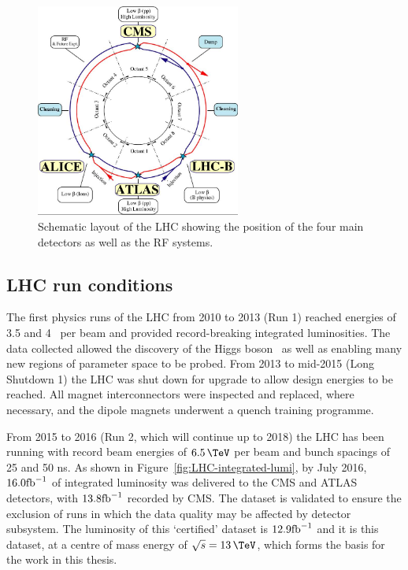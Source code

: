 \begin{figure}
\centering
    \includegraphics[width=0.6\textwidth]{./Figures/detector/lhcDiagram}
  \caption{Schematic layout of the LHC showing the position of the four main detectors as
  well as the RF systems.}
  \label{fig:LHC-diagram}
\end{figure}

\subsection{LHC run conditions}

The first physics runs of the LHC from 2010 to 2013 (Run 1) reached energies of 3.5 and 4 \TeV~per beam and 
provided record-breaking integrated luminosities. The data collected allowed the 
discovery of the Higgs boson~\cite{cmsHiggs,atlasHiggs} as well as enabling many new regions of parameter space
to be probed. From 2013 to mid-2015 (Long Shutdown 1) the LHC was shut down for upgrade to allow design
energies to be reached. All magnet interconnectors were inspected and replaced, where necessary,
and the dipole magnets underwent a quench training programme. 

From 2015 to 2016 (Run 2, which will continue up to 2018) the LHC has been running with record beam energies 
of $6.5\,\TeV$ per beam and bunch spacings of 25 and 50 ns. 
As shown in Figure~\ref{fig:LHC-integrated-lumi}, by July 2016, $16.0 \text{fb}^{-1}$ of integrated luminosity was
delivered to the CMS and ATLAS detectors, with $13.8 \text{fb}^{-1}$ recorded by CMS. The dataset is validated 
to ensure the exclusion of runs in which the data quality may be affected by detector subsystem. 
The luminosity of this `certified' dataset is $12.9 \text{fb}^{-1}$ and it is this dataset, 
at a centre of mass energy of $\sqrt{s} = 13\,\TeV$, which forms the basis for the work in this thesis.

